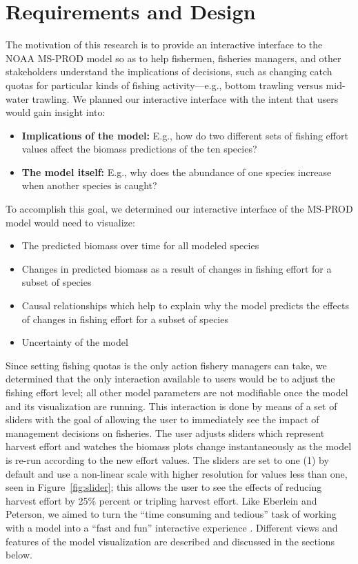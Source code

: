 \chapter{Requirements and Design}

The motivation of this research is to provide an interactive interface to the NOAA MS-PROD model so as to help fishermen, fisheries managers, and other stakeholders understand the implications of decisions, such as changing catch quotas for particular kinds of fishing activity---e.g., bottom trawling versus mid-water trawling.  We planned our interactive interface with the intent that users would gain insight into:

\begin{itemize}
	\item \textbf{Implications of the model:}  E.g., how do two different sets of fishing effort values affect the biomass predictions of the ten species?
	\item \textbf{The model itself:}  E.g., why does the abundance of one species increase when another species is caught? 
\end{itemize} 

To accomplish this goal, we determined our interactive interface of the MS-PROD model would need to visualize:

\begin{itemize}
	\item The predicted biomass over time for all modeled species
	\item Changes in predicted biomass as a result of changes in fishing effort for a subset of species
	\item Causal relationships which help to explain why the model predicts the effects of changes in fishing effort for a subset of species
	\item Uncertainty of the model
\end{itemize} 

Since setting fishing quotas is the only action fishery managers can take, we determined that the only interaction available to users would be to adjust the fishing effort level; all other model parameters are not modifiable once the model and its visualization are running.  This interaction is done by means of a set of sliders with the goal of allowing the user to immediately see the impact of management decisions on fisheries.  The user adjusts sliders which represent harvest effort and watches the biomass plots change instantaneously as the model is re-run according to the new effort values.  The sliders are set to one (1) by default and use a non-linear scale with higher resolution for values less than one, seen in Figure~\ref{fig:slider}; this allows the user to see the effects of reducing harvest effort by 25\% percent or tripling harvest effort.  Like Eberlein and Peterson, we aimed to turn the ``time consuming and tedious'' task of working with a model into a ``fast and fun'' interactive experience \citeyear{eberlein1992}.  Different views and features of the model visualization are described and discussed in the sections below.  

